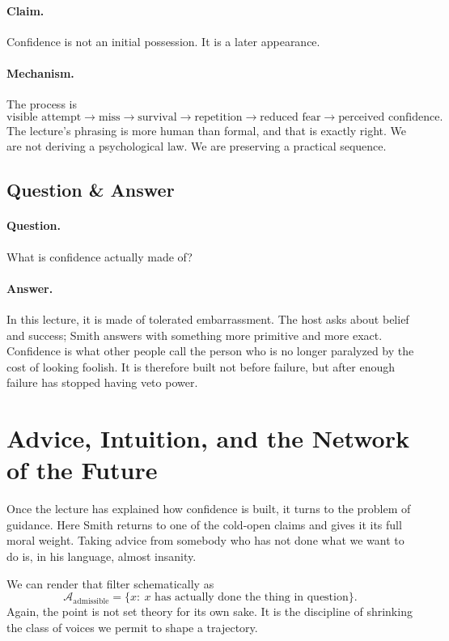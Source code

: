 \paragraph{Claim.}
Confidence is not an initial possession. It is a later appearance.

\paragraph{Mechanism.}
The process is
\[
\text{visible attempt}
\to
\text{miss}
\to
\text{survival}
\to
\text{repetition}
\to
\text{reduced fear}
\to
\text{perceived confidence}.
\]
The lecture's phrasing is more human than formal, and that is exactly right. We are not deriving a psychological law. We are preserving a practical sequence.

\subsection{Question \& Answer}

\paragraph{Question.} What is confidence actually made of?

\paragraph{Answer.} In this lecture, it is made of tolerated embarrassment. The host asks about belief and success; Smith answers with something more primitive and more exact. Confidence is what other people call the person who is no longer paralyzed by the cost of looking foolish. It is therefore built not before failure, but after enough failure has stopped having veto power.

\section{Advice, Intuition, and the Network of the Future}

Once the lecture has explained how confidence is built, it turns to the problem of guidance. Here Smith returns to one of the cold-open claims and gives it its full moral weight. Taking advice from somebody who has not done what we want to do is, in his language, almost insanity.

We can render that filter schematically as
\begin{equation}
\mathcal A_{\mathrm{admissible}}
=
\{x:\ x \text{ has actually done the thing in question}\}.
\end{equation}
Again, the point is not set theory for its own sake. It is the discipline of shrinking the class of voices we permit to shape a trajectory.

